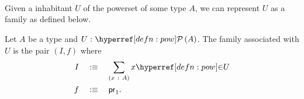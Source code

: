 \begin{center}
\begin{code}%
\>[0]\AgdaSpace{}%
\AgdaSymbol{:}\AgdaSpace{}%
\AgdaSymbol{\{}\AgdaSpace{}%
\AgdaSymbol{:}\AgdaSpace{}%
\AgdaSpace{}%
\AgdaSymbol{\}}\AgdaSpace{}%
\AgdaSymbol{\{}\AgdaSpace{}%
\AgdaSymbol{:}\AgdaSpace{}%
\AgdaSpace{}%
\AgdaSymbol{\}}\AgdaSpace{}%
\AgdaSpace{}%
\AgdaSymbol{(}\AgdaSpace{}%
\AgdaSymbol{:}\AgdaSpace{}%
\AgdaSpace{}%
\AgdaSpace{}%
\AgdaSymbol{)}\AgdaSpace{}%
\AgdaSpace{}%
\AgdaSymbol{(}\AgdaSpace{}%
\AgdaSymbol{:}\AgdaSpace{}%
\AgdaSpace{}%
\AgdaSpace{}%
\AgdaSymbol{)}\AgdaSpace{}%
\AgdaSpace{}%
\AgdaSpace{}%
\AgdaSpace{}%
\<%
\\
\>[0]\AgdaSpace{}%
\AgdaSpace{}%
\AgdaSpace{}%
\AgdaSymbol{=}\AgdaSpace{}%
\AgdaSpace{}%
\AgdaOperator{\AgdaInductiveConstructor{,}}\AgdaSpace{}%
\AgdaSpace{}%
\AgdaSpace{}%
\AgdaSpace{}\<%
\\
%
\\[\AgdaEmptyExtraSkip]%
\>[0]\AgdaSpace{}%
\AgdaSpace{}%
\AgdaSpace{}%
\AgdaSpace{}%
\AgdaSpace{}%
\AgdaSymbol{)}\AgdaSpace{}%
\AgdaSpace{}%
\AgdaSymbol{=}\AgdaSpace{}%
\AgdaSpace{}%
\AgdaSpace{}%
\AgdaSpace{}%
\AgdaSpace{}%
\AgdaSpace{}%
\AgdaSpace{}%
\<%
\end{code}
\end{center}

Given a inhabitant $U$ of the powerset of some type $A$, we can represent $U$ as a family
as defined below.
\begin{defn}
  Let $A$ be a type and $\oftyI{U}{\pow{A}}$. The family associated with $U$ is
  the pair $(I, f)$ where
  \begin{align*}
    I \quad&\is\quad \sigmaty{x}{A}{\mempow{x}{U}} \\
    f \quad&\is\quad \mathsf{pr}_1        .
  \end{align*}
\end{defn}

